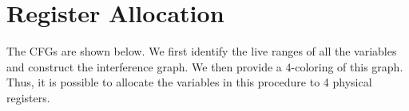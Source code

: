 \section{Register Allocation}

The CFGs are shown below. 
We first identify the live ranges of all the variables and
construct the interference graph. We then provide
a 4-coloring of this graph. Thus, it is possible to allocate
the variables in this procedure to 4 physical registers.


